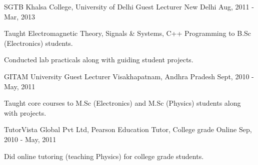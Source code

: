 

\begin{cventries}


  \cventry
    {SGTB Khalsa College, University of Delhi} %
    {Guest Lecturer} %
    {New Delhi} %
    {Aug, 2011 - Mar, 2013} %
    {
      \begin{cvitems} %
        \item {Taught Electromagnetic Theory, Signals \& Systems, C++ Programming to B.Sc (Electronics) students.}
        \item {Conducted lab practicals along with guiding student projects.}
      \end{cvitems}
    }

  \cventry
    {GITAM University} %
    {Guest Lecturer} %
    {Visakhapatnam, Andhra Pradesh} %
    {Sept, 2010 - May, 2011} %
    {
      \begin{cvitems} %
        \item {Taught core courses to M.Sc (Electronics) and M.Sc (Physics) students along with projects.}
      \end{cvitems}
    }
  \cventry
    {TutorVista Global Pvt Ltd, Pearson Education} %
    {Tutor, College grade} %
    {Online} %
    {Sep, 2010 - May, 2011} %
    {
      \begin{cvitems} %
        \item {Did online tutoring (teaching Physics) for college grade students.}
      \end{cvitems}
    }


\end{cventries}
